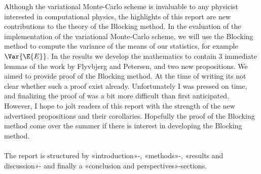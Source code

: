 \documentclass[11pt,english,a4paper]{article}
\begin{document}
Although the variational Monte-Carlo scheme is invaluable to any physicist interested in computational physics, the highlights of this report are new contributions to the theory of the Blocking method. In the evaluation of the implementation of the variational Monte-Carlo scheme, we will use the Blocking method to compute the variance of the means of our statistics, for example $\Var{\E{E}}$. In the results we develop the mathematics to contain 3 immediate lemmas of the work by Flyvbjerg and Petersen, and two new propositions. We aimed to provide proof of the Blocking method. At the time of writing its not clear whether such a proof exist already. Unfortunately I was pressed on time, and finalizing the proof of was a bit more difficult than first anticipated. However, I hope to jolt readers of this report with the strength of the new advertised propositions and their corollaries. Hopefully the proof of the Blocking method come over the summer if there is interest in developing the Blocking method.\\
\\
The report is structured by «introduction»-, «methods»-, «results and discussion»- and finally a «conclusion and perspectives»-sections.
\end{document}
